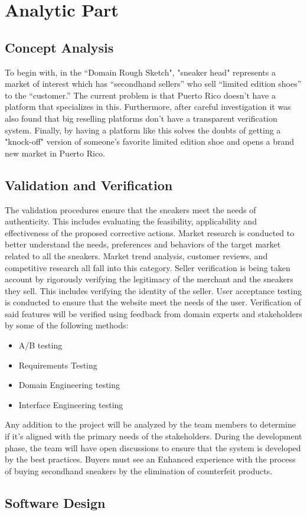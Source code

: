 \chapter{Analytic Part}
\section{Concept Analysis}
\hspace{1cm} To begin with, in the “Domain Rough Sketch", 
"sneaker head" represents a market of interest which has “secondhand sellers” who sell “limited edition shoes” to the “customer.” 
The current problem is that Puerto Rico doesn't have a platform that specializes in this. Furthermore, after careful investigation it was also found that big reselling platforms don't have a transparent verification system. Finally, by having a platform like this solves the doubts of getting a "knock-off" version of someone's favorite limited edition shoe and opens a brand new market in Puerto Rico.
\section{Validation and Verification}
\hspace{1cm} The validation procedures ensure that the sneakers meet the needs of authenticity. This includes evaluating the feasibility, applicability and effectiveness of the proposed corrective actions.
Market research is conducted to better understand the needs, preferences and behaviors of the target market related to all the sneakers. Market trend analysis, customer reviews, and competitive research all fall into this category.
Seller verification is being taken account by rigorously verifying the legitimacy of the merchant and the sneakers they sell. This includes verifying the identity of the seller.
User acceptance testing is conducted to ensure that the website meet the needs of the user. Verification of said features will be verified using feedback from domain experts and stakeholders by some of the following methods:
\begin{itemize}
  \item A/B testing
  \item Requirements Testing
  \item Domain Engineering testing
  \item Interface Engineering testing
\end{itemize}
Any addition to the project will be analyzed by the team members to determine if it’s aligned with the primary needs of the stakeholders. During the development phase, the team will have open discussions to ensure that the system is developed by the best practices. Buyers must see an Enhanced experience with the process of buying secondhand sneakers by the elimination of counterfeit products.
\section{Software Design}
